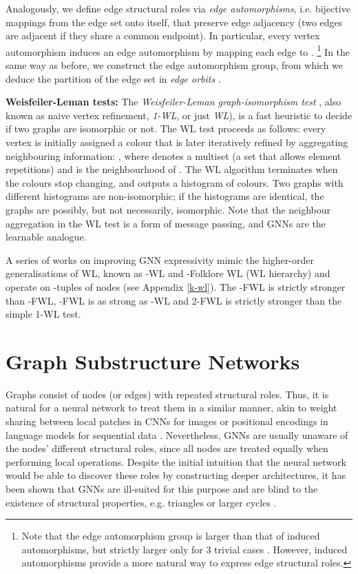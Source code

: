 \documentclass{article} \usepackage{iclr2021_conference,times}
\begin{document}
Analogously, we define edge structural roles via \textit{edge automorphisms}, i.e. bijective mappings from the edge set onto itself, that preserve edge adjacency (two edges are adjacent if they share a common endpoint). In particular, every vertex automorphism  induces an edge automorphism by mapping each edge  to . \footnote{Note that the edge automorphism group is larger than that of induced automorphisms, but strictly larger only for 3 trivial cases \citep{Whitney1932}. However, induced automorphisms provide a more natural way to express edge structural roles.} In the same way as before, we construct the edge automorphism group, from which we deduce the partition of the edge set in {\em edge orbits} .


\noindent\textbf{Weisfeiler-Leman tests:} The {\em Weisfeiler-Leman graph-isomorphism test} \citep{weisfeilerreduction}, also known as naive vertex refinement, \textit{1-WL}, or just \textit{WL}), is a fast heuristic to decide if two graphs are isomorphic or not. The WL test proceeds as follows: every vertex  is initially assigned a colour  that is later iteratively refined by aggregating neighbouring information: , where  denotes a multiset (a set that allows element repetitions) and  is the neighbourhood of . The WL algorithm terminates when the colours stop changing, and outputs a histogram of colours. Two graphs with different histograms are non-isomorphic; if the histograms are identical, the graphs are possibly, but not necessarily, isomorphic. Note that the neighbour aggregation in the WL test is a form of message passing, and GNNs are the learnable analogue. 

A series of works on improving GNN expressivity mimic the higher-order generalisations of WL, known as -WL and -Folklore WL (WL hierarchy) and operate on -tuples of nodes (see Appendix \ref{k-wl}). The -FWL is strictly stronger than -FWL, -FWL is as strong as -WL and 2-FWL is strictly stronger than the simple 1-WL test. 

\section{Graph Substructure Networks}

Graphs consist of nodes (or edges) with repeated structural roles. Thus, it is natural for a neural network to treat them in a similar manner, akin to weight sharing between local patches in CNNs for images \citep{lecun1989backpropagation} or positional encodings in language models for sequential data \citep{DBLP:conf/nips/SukhbaatarSWF15, DBLP:conf/icml/GehringAGYD17, vaswani2017attention}. 
Nevertheless, GNNs are usually unaware of the nodes' different structural roles, since all nodes are treated equally when performing local operations. Despite the initial intuition that the neural network would be able to discover these roles by constructing deeper architectures, it has been shown that GNNs are ill-suited for this purpose and are blind to the existence of structural properties, e.g. triangles or larger cycles \citep{chen2020can, DBLP:conf/fct/ArvindFKV19}. 
\end{document}
